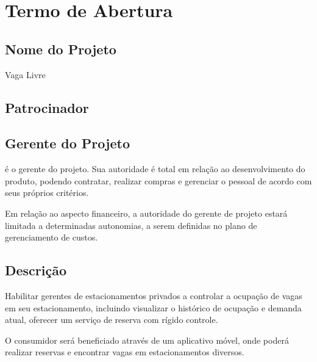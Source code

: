 
\section{Termo de Abertura}

\subsection{Nome do Projeto}

Vaga Livre

\subsection{Patrocinador}

\projectSponsorName


\subsection{Gerente do Projeto}

\projectManagerName é o gerente do projeto. Sua autoridade é total em relação ao desenvolvimento do produto, podendo contratar, realizar compras e gerenciar o pessoal de acordo com seus próprios critérios.

Em relação ao aspecto financeiro, a autoridade do gerente de projeto estará limitada a determinadas autonomias, a serem definidas no plano de gerenciamento de custos.


\subsection{Descrição}

Habilitar gerentes de estacionamentos privados a controlar a ocupação de vagas em seu estacionamento, incluindo visualizar o histórico de ocupação e demanda atual, oferecer um serviço de reserva com rígido controle.

O consumidor será beneficiado através de um aplicativo móvel, onde poderá realizar reservas e encontrar vagas em estacionamentos diversos.

